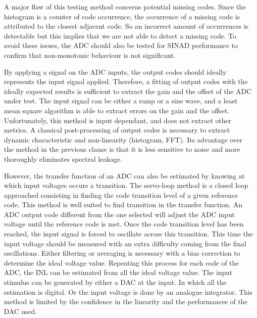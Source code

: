 A major flaw of this testing method concerns potential missing codes. Since the histogram is a counter of code occurrence, the occurrence of a missing code is attributed to the closest adjacent code. So an incorrect amount of occurrences is detectable but this implies that we are not able to detect a missing code. To avoid these issues, the ADC should also be tested for SINAD performance to confirm that non-monotonic behaviour is not significant.

By applying a signal on the ADC inputs, the output codes should ideally represents the input signal applied. Therefore, a fitting of output codes with the ideally expected results is sufficient to extract the gain and the offset of the ADC under test. The input signal can be either a ramp or a sine wave, and a least mean square algorithm is able to extract errors on the gain and the offset.
Unfortunately, this method is input dependant, and does not extract other metrics. A classical post-processing of output codes is necessary to extract dynamic characteristic and non-linearity (histogram, FFT). Its advantage over the method in the previous clause is that it is less sensitive to noise and more thoroughly eliminates spectral leakage.

However, the transfer function of an ADC can also be estimated by knowing at which input voltages occurs a transition. The servo-loop method is a closed loop approached consisting in finding the code transition level of a given reference code. This method is well suited to find transition in the transfer function.
An ADC output code different from the one selected will adjust the ADC input voltage until the reference code is met. Once the code transition level has been reached, the input signal is forced to oscillate across this transition.
This time the input voltage should be measured with an extra difficulty coming from the final oscillations. Either filtering or averaging is necessary with a bias correction to determine the ideal voltage value. Repeating this process for each code of the ADC, the INL can be estimated from all the ideal voltage value.
The input stimulus can be generated by either a DAC at the input. In which all the estimation is digital. Or the input voltage is done by an analogue integrator. This method is limited by the confidence in the linearity and the performances of the DAC used.

